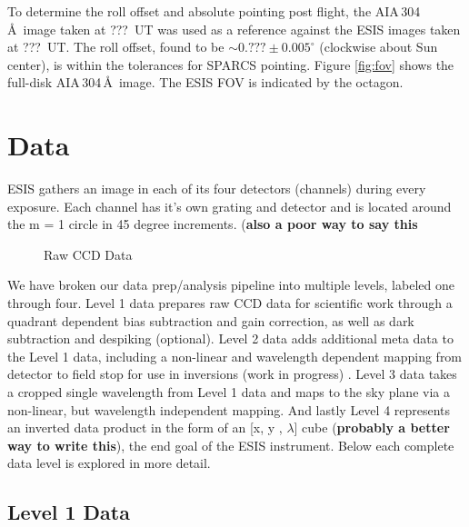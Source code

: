 		To determine the roll offset and absolute pointing post flight, the AIA\,304\,\AA\ image taken at ???~UT was used as a reference against the ESIS images taken at ???~UT.  The roll offset, found to be $\sim0.???\pm 0.005^\circ$ (clockwise about Sun center), is within the tolerances for SPARCS pointing.  Figure \ref{fig:fov} shows the full-disk AIA\,304\,\AA\ image. The ESIS FOV is indicated by the octagon.  
	
\section{Data} 

    ESIS gathers an image in each of its four detectors (channels) during every exposure.  
    Each channel has it's own grating and detector and is located around the m = 1 circle in 45 degree increments. (\textbf{also a poor way to say this}
    
    \begin{figure}[ht]
        \centering
        \caption{Raw CCD Data}
        \label{fig:Level0}
    \end{figure}
    
    We have broken our data prep/analysis pipeline into multiple levels, labeled one through four.
    Level 1 data prepares raw CCD data for scientific work through a quadrant dependent bias subtraction and gain correction, as well as dark subtraction and despiking (optional).
    Level 2 data adds additional meta data to the Level 1 data, including a non-linear and wavelength dependent mapping from detector to field stop for use in inversions (work in progress)  .
    Level 3 data takes a cropped single wavelength from Level 1 data and maps to the sky plane via a non-linear, but wavelength independent mapping.
    And lastly Level 4 represents an inverted data product in the form of an [x, y , $\lambda$] cube (\textbf{probably a better way to write this}), the end goal of the ESIS instrument.
    Below each complete data level is explored in more detail.
    
    \subsection{Level 1 Data}
    
